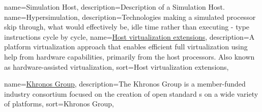{
  name={Simulation Host},
  description={Description of a Simulation Host.}
}
\newcommand{\dvttermhost}{\dvtcmdcaponcegloss{dvtglosshost}{Host}}
\newcommand{\dvttermhewlettpackard}{Hewlett-Packard Company}
\newcommand{\dvttermhoneywell}{Honeywell International, Inc.}
{
  name={Hypersimulation},
  description={Technologies making a simulated processor skip through, what would effectively be, idle time rather than executing - type instructions cycle by cycle},
}
\newcommand{\dvttermhypersimulation}{\dvtcmdcaponcegloss{dvtglosshypersimulation}{Hypersimulation}}
{
  name={\href{http://en.wikipedia.org/wiki/Hardware-assisted_virtualization}{Host virtualization extensions}},
  description={A platform virtualization approach that enables efficient full virtualization using help from hardware capabilities, primarily from the host processors. Also known as hardware-assisted virtualization},
  sort={Host virtualization extensions},
}
\newcommand{\dvttermhostvirtualizationextensions}{\dvtcmdcaponcegloss{dvtglosshostvirtualizationextensions}{Host Virtualization Extensions}}

\newcommand{\dvtterminterpretation}{\dvtcmdcaponce{Interpretation}}
\newcommand{\dvttermintel}{Intel~Corporation}
\newcommand{\dvttermibm}{IBM}

\newcommand{\dvttermjit}{\dvtcmdabbrev{dvtglossjit}}
\newcommand{\dvttermjni}{\dvtcmdabbrev{dvtglossjni}}

{
  name={\href{http://en.wikipedia.org/wiki/Khronos_Group}{Khronos Group}},
  description={The Khronos Group is a member-funded industry consortium focused on the creation of open standard \dvttermapi s on a wide variety of platforms},
  sort={Khronos Group},
}
\newcommand{\dvttermkhronos}{\glslink{dvtglosskhronos}{Khronos}}

\newcommand{\dvttermlinux}{Linux}
\newcommand{\dvttermlockheedmartin}{Lockheed Martin}

\newcommand{\dvttermmipsecond}{\dvtcmdabbrev{dvtglossmipssecond}}
\newcommand{\dvttermmicrosoft}{Microsoft}

